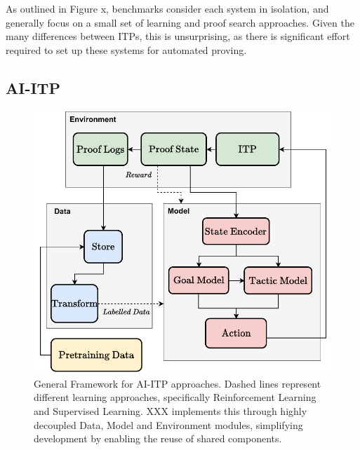 \documentclass[letterpaper]{article} %
\begin{document}
    As outlined in Figure x, benchmarks consider each system in isolation, and generally focus on a small set of
    learning and proof search approaches.
    Given the many differences between ITPs, this is unsurprising, as there is significant effort required to set
    up these systems for automated proving.

%
%

    \subsection{AI-ITP}
    \begin{figure}[h]
        \centering
        \includegraphics[width=\linewidth]{AI-ITP_colour_1.drawio}
        \caption{General Framework for AI-ITP approaches. Dashed lines represent different learning approaches,
            specifically Reinforcement Learning and Supervised Learning.
            XXX implements this through highly decoupled Data, Model and Environment modules,
            simplifying development by enabling the reuse of shared components.}
        \label{fig:ai-itp}
    \end{figure}
\end{document}
